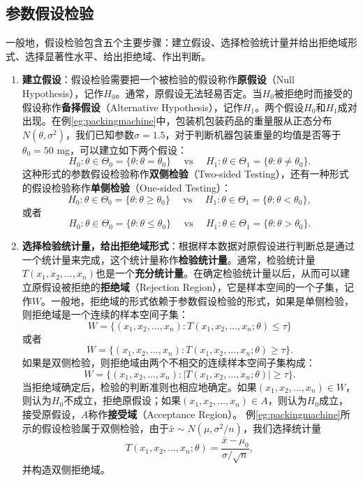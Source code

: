 \subsection{参数假设检验}
一般地，假设检验包含五个主要步骤：建立假设、选择检验统计量并给出拒绝域形式、选择显著性水平、给出拒绝域、作出判断。

\begin{enumerate}[Step 1.]
  \item
  \textbf{建立假设}：假设检验需要把一个被检验的假设称作\textbf{原假设}（Null Hypothesis），记作$H_0$。通常，原假设无法轻易否定。当$H_0$被拒绝时而接受的假设称作\textbf{备择假设}（Alternative Hypothesis），记作$H_1$。两个假设$H_0$和$H_1$成对出现。在例\ref{eg:packingmachine}中，包装机包装药品的重量服从正态分布$N(\theta,\sigma^2)$，我们已知参数$\sigma=1.5$，对于判断机器包装重量的均值是否等于$\theta_0=50$ mg，可以建立如下两个假设：\[H_0: \theta\in \Theta_0 =\{\theta: \theta = \theta_0\} ~~~~~~ \textrm{vs}  ~~~~~~ H_1: \theta\in \Theta_1 =\{\theta: \theta \ne \theta_0\}.\]
  这种形式的参数假设检验称作\textbf{双侧检验}（Two-sided Testing），还有一种形式的假设检验称作\textbf{单侧检验}（One-sided Testing）：
  \[H_0: \theta\in \Theta_0 =\{\theta: \theta \ge \theta_0\} ~~~~~~ \textrm{vs}  ~~~~~~ H_1: \theta\in \Theta_1 =\{\theta: \theta < \theta_0\},\] 或者\[H_0: \theta\in \Theta_0 =\{\theta: \theta \le \theta_0\} ~~~~~~ \textrm{vs}  ~~~~~~ H_1: \theta\in \Theta_1 =\{\theta: \theta > \theta_0\}.\]
  \item
  \textbf{选择检验统计量，给出拒绝域形式}：根据样本数据对原假设进行判断总是通过一个统计量来完成，这个统计量称作\textbf{检验统计量}。通常，检验统计量$T(x_1,x_2,\ldots,x_n)$也是一个\textbf{充分统计量}。在确定检验统计量以后，从而可以建立原假设被拒绝的\textbf{拒绝域}（Rejection Region），它是样本空间的一个子集，记作$W$。一般地，拒绝域的形式依赖于参数假设检验的形式，如果是单侧检验，则拒绝域是一个连续的样本空间子集：
  \[W=\{(x_1,x_2,\ldots,x_n): T(x_1,x_2,\ldots,x_n; \theta) \le \tau\}\]或者\[W=\{(x_1,x_2,\ldots,x_n): T(x_1,x_2,\ldots,x_n; \theta) \ge \tau\}.\]
  如果是双侧检验，则拒绝域由两个不相交的连续样本空间子集构成：
  \[W=\{(x_1,x_2,\ldots,x_n): |T(x_1,x_2,\ldots,x_n; \theta)| \ge \tau\}.\]
  当拒绝域确定后，检验的判断准则也相应地确定。如果$(x_1,x_2,\ldots,x_n)\in W$，则认为$H_0$不成立，拒绝原假设；如果$(x_1,x_2,\ldots,x_n)\in A$，则认为$H_0$成立，接受原假设，$A$称作\textbf{接受域}（Acceptance Region）。
  例\ref{eg:packingmachine}所示的假设检验属于双侧检验，由于$\bar x\sim N(\mu, \sigma^2/n)$，我们选择统计量
  \[T(x_1,x_2,\ldots,x_n; \theta)=\frac{\bar x - \mu_0}{\sigma/\sqrt{n}},\]并构造双侧拒绝域。

\end{enumerate}
